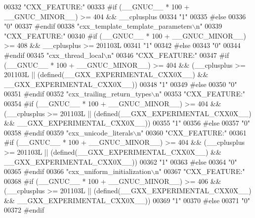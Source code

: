 \begin{DoxyCode}
00332 \textcolor{stringliteral}{"CXX\_FEATURE:"}
00333 \textcolor{preprocessor}{#if (\_\_GNUC\_\_ * 100 + \_\_GNUC\_MINOR\_\_) >= 404 && \_\_cplusplus}
00334 \textcolor{stringliteral}{"1"}
00335 \textcolor{preprocessor}{#else}
00336 \textcolor{stringliteral}{"0"}
00337 \textcolor{preprocessor}{#endif}
00338 \textcolor{stringliteral}{"cxx\_template\_template\_parameters\(\backslash\)n"}
00339 \textcolor{stringliteral}{"CXX\_FEATURE:"}
00340 \textcolor{preprocessor}{#if (\_\_GNUC\_\_ * 100 + \_\_GNUC\_MINOR\_\_) >= 408 && \_\_cplusplus >= 201103L}
00341 \textcolor{stringliteral}{"1"}
00342 \textcolor{preprocessor}{#else}
00343 \textcolor{stringliteral}{"0"}
00344 \textcolor{preprocessor}{#endif}
00345 \textcolor{stringliteral}{"cxx\_thread\_local\(\backslash\)n"}
00346 \textcolor{stringliteral}{"CXX\_FEATURE:"}
00347 \textcolor{preprocessor}{#if (\_\_GNUC\_\_ * 100 + \_\_GNUC\_MINOR\_\_) >= 404 && (\_\_cplusplus >= 201103L ||
       (defined(\_\_GXX\_EXPERIMENTAL\_CXX0X\_\_) && \_\_GXX\_EXPERIMENTAL\_CXX0X\_\_))}
00348 \textcolor{stringliteral}{"1"}
00349 \textcolor{preprocessor}{#else}
00350 \textcolor{stringliteral}{"0"}
00351 \textcolor{preprocessor}{#endif}
00352 \textcolor{stringliteral}{"cxx\_trailing\_return\_types\(\backslash\)n"}
00353 \textcolor{stringliteral}{"CXX\_FEATURE:"}
00354 \textcolor{preprocessor}{#if (\_\_GNUC\_\_ * 100 + \_\_GNUC\_MINOR\_\_) >= 404 && (\_\_cplusplus >= 201103L ||
       (defined(\_\_GXX\_EXPERIMENTAL\_CXX0X\_\_) && \_\_GXX\_EXPERIMENTAL\_CXX0X\_\_))}
00355 \textcolor{stringliteral}{"1"}
00356 \textcolor{preprocessor}{#else}
00357 \textcolor{stringliteral}{"0"}
00358 \textcolor{preprocessor}{#endif}
00359 \textcolor{stringliteral}{"cxx\_unicode\_literals\(\backslash\)n"}
00360 \textcolor{stringliteral}{"CXX\_FEATURE:"}
00361 \textcolor{preprocessor}{#if (\_\_GNUC\_\_ * 100 + \_\_GNUC\_MINOR\_\_) >= 404 && (\_\_cplusplus >= 201103L ||
       (defined(\_\_GXX\_EXPERIMENTAL\_CXX0X\_\_) && \_\_GXX\_EXPERIMENTAL\_CXX0X\_\_))}
00362 \textcolor{stringliteral}{"1"}
00363 \textcolor{preprocessor}{#else}
00364 \textcolor{stringliteral}{"0"}
00365 \textcolor{preprocessor}{#endif}
00366 \textcolor{stringliteral}{"cxx\_uniform\_initialization\(\backslash\)n"}
00367 \textcolor{stringliteral}{"CXX\_FEATURE:"}
00368 \textcolor{preprocessor}{#if (\_\_GNUC\_\_ * 100 + \_\_GNUC\_MINOR\_\_) >= 406 && (\_\_cplusplus >= 201103L ||
       (defined(\_\_GXX\_EXPERIMENTAL\_CXX0X\_\_) && \_\_GXX\_EXPERIMENTAL\_CXX0X\_\_))}
00369 \textcolor{stringliteral}{"1"}
00370 \textcolor{preprocessor}{#else}
00371 \textcolor{stringliteral}{"0"}
00372 \textcolor{preprocessor}{#endif}

\end{DoxyCode}
